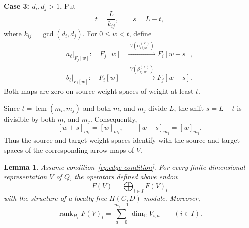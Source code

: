 \documentclass[12pt,reqno]{amsart}
\numberwithin{equation}{section}
\newtheorem{lemma}[theorem]{Lemma}
\theoremstyle{definition}
\theoremstyle{remark}
\newcommand{\lcm}{\operatorname{lcm}}
\newcommand{\rank}{\operatorname{rank}}
\theoremstyle{plain}
\theoremstyle{plain}
\begin{document}
\par\smallskip
\noindent\textbf{Case 3: $d_i,d_j>1$.}
Put
\[
t=\frac{L}{k_{ij}},
\qquad
s=L-t,
\]
where $k_{ij}=\gcd(d_i,d_j)$. For $0\leq w<t$, define
\begin{equation}\label{eq:inj-thickplacement}
\begin{aligned}
a_\ell\big|_{F_j[w]}:\quad
F_j[w]
&\xrightarrow{\;V(\alpha_{ij,w}^{(\ell)})\;}
F_i[w+s],\\
b_\ell\big|_{F_i[w]}:\quad
F_i[w]
&\xrightarrow{\;V(\beta_{ij,w}^{(\ell)})\;}
F_j[w+s].
\end{aligned}
\end{equation}
Both maps are zero on source weight spaces of weight at least $t$.

Since $t=\lcm(m_i,m_j)$ and both
$m_i$ and $m_j$ divide $L$, the shift $s=L-t$
is divisible by both $m_i$ and $m_j$.
Consequently,
\[
    [w+s]_{m_i}=[w]_{m_i},
    \qquad
    [w+s]_{m_j}=[w]_{m_j}.
\]
Thus the source and target weight spaces identify with the source and target spaces of the corresponding arrow maps of $V$.

\begin{lemma}\label{lem:relations}
Assume condition~\eqref{eq:edge-condition}. For every finite-dimensional representation $V$ of $Q$, the operators defined above endow
\[
    F(V)=\bigoplus_{i\in I}F(V)_i
\]
with the structure of a locally free $\Pi(C,D)$-module.
Moreover,
\[
    \rank_{H_i}F(V)_i
    =
    \sum_{a=0}^{m_i-1}\dim_{\mathbb C}V_{i,a}
    \qquad(i\in I).
\]
\end{lemma}
\end{document}
